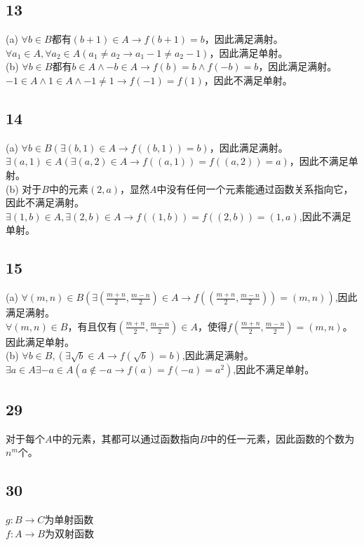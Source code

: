 \documentclass{article}
\begin{document}
\subsection{13}
(a) $\forall b \in B$都有$(b + 1) \in A \rightarrow f(b + 1) = b$，因此满足满射。\\
$\forall a_1 \in A, \forall a_2 \in A(a_1 \neq a_2 \rightarrow a_1 - 1 \neq a_2 - 1 )$，因此满足单射。\\
(b) $\forall b \in B$都有$b \in A \land -b \in A \rightarrow f(b) = b \land f(-b) = b$，因此满足满射。\\
$-1 \in A \land 1 \in A \land -1 \neq 1 \rightarrow f(-1) = f(1)$，因此不满足单射。
\subsection{14}
(a) $\forall b \in B(\exists (b, 1) \in A \rightarrow f((b, 1)) = b)$，因此满足满射。\\
$\exists (a, 1) \in A(\exists (a, 2) \in A \rightarrow f((a, 1)) = f((a, 2)) = a)$，因此不满足单射。\\
(b) 对于$B$中的元素$(2, a)$，显然$A$中没有任何一个元素能通过函数关系指向它，因此不满足满射。\\
$\exists (1,b) \in A, \exists (2, b) \in A \rightarrow f((1, b)) = f((2, b)) = (1, a)$,因此不满足单射。
\subsection{15}
(a) $\forall (m, n) \in B(\exists (\frac{m + n}{2}, \frac{m - n}{2}) \in A \rightarrow f((\frac{m + n}{2}, \frac{m - n}{2}))
= (m, n))$,因此满足满射。\\
$\forall (m, n) \in B$，有且仅有$(\frac{m + n}{2}, \frac{m - n}{2}) \in A$，使得$f(\frac{m + n}{2}, \frac{m - n}{2}) = (m, n)$。因此满足单射。\\
(b) $\forall b \in B, (\exists \sqrt{b} \in A \rightarrow f( \sqrt{b} ) = b)$,因此满足满射。\\
$\exists a \in A \exists -a \in A(a \notin -a \rightarrow f(a) = f(-a) = a^2)$,因此不满足单射。
\subsection{29}
对于每个$A$中的元素，其都可以通过函数指向$B$中的任一元素，因此函数的个数为$n^m$个。
\subsection{30}
$g:B \rightarrow C$为单射函数\\
$f:A \rightarrow B$为双射函数
\end{document}
